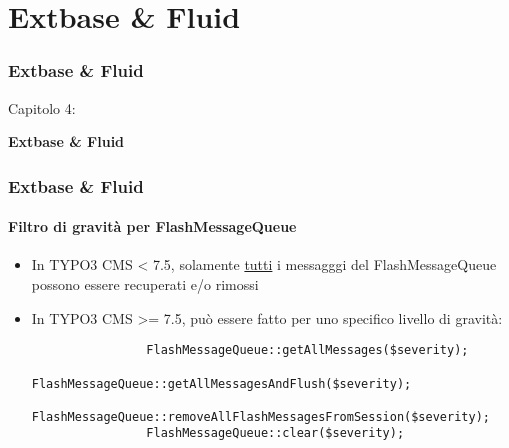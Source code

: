 %

\section{Extbase \& Fluid}
\begin{frame}[fragile]
	\frametitle{Extbase \& Fluid}

	\begin{center}\huge{Capitolo 4:}\end{center}
	\begin{center}\huge{\color{typo3darkgrey}\textbf{Extbase \& Fluid}}\end{center}

\end{frame}


\begin{frame}[fragile]
	\frametitle{Extbase \& Fluid}
	\framesubtitle{Filtro di gravità per FlashMessageQueue}

	\begin{itemize}

		\item In TYPO3 CMS < 7.5, solamente \underline{tutti} i messagggi del FlashMessageQueue possono essere
			recuperati e/o rimossi

		\item In TYPO3 CMS >= 7.5, può essere fatto per uno specifico livello di gravità:

			\begin{lstlisting}
				FlashMessageQueue::getAllMessages($severity);
				FlashMessageQueue::getAllMessagesAndFlush($severity);
				FlashMessageQueue::removeAllFlashMessagesFromSession($severity);
				FlashMessageQueue::clear($severity);
			\end{lstlisting}

	\end{itemize}

\end{frame}


